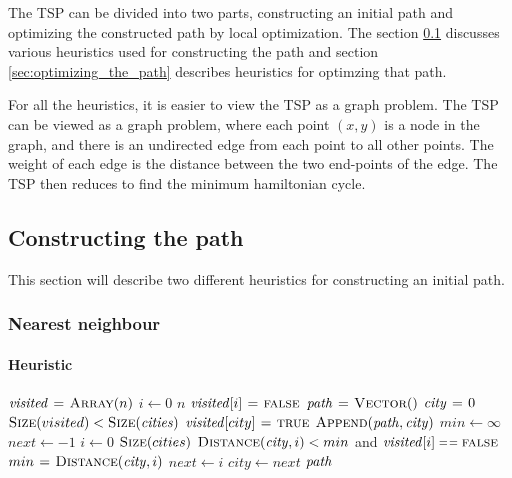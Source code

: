 The TSP can be divided into two parts, constructing an initial path and
optimizing the constructed path by local optimization.
The section \ref{sec:constructing_the_path}
discusses various heuristics used for constructing the path and section
\ref{sec:optimizing_the_path} describes heuristics for optimzing that path.  

For all the heuristics, it is easier to view the TSP as a graph problem.
The TSP can be viewed as a graph problem, where each point $(x, y)$ is a node in
the graph, and there is an undirected edge from each point to all other points. 
The weight of each edge is the distance between the two end-points of the edge.
The TSP then reduces to find the minimum hamiltonian cycle.

\subsection{Constructing the path}
\label{sec:constructing_the_path}
This section will describe two different heuristics for constructing an
initial path.

\subsubsection{Nearest neighbour}
\label{sec:nearest_neighbour}
\paragraph{Heuristic}
\begin{codebox}
\li $\id{visited} \gets \proc{Array}(n)$
\li \For $i \gets 0$ \To $n$
\li     \Do
            $\id{visited}[i] \gets \const{false}$
        \End
\li $\id{path} \gets \proc{Vector}()$
\li $\id{city} \gets 0$
\li \While $\proc{Size}(visited) < \proc{Size}(\id{cities})$
\label{li:nn:outer}
\li     \Do
            $\id{visited}[city] \gets \const{true}$
\li         $\proc{Append}(\id{path}, \id{city})$
\li         $min \gets \infty$
\li         $next \gets -1$
\li         \For $i \gets 0$ \To $\textnormal{\scshape Size}(cities)$ \label{li:nn:inner}
\li             \Do
                    \If $\proc{Distance}(\id{city}, i) < min$ and
                        $\id{visited}[i] \isequal \const{false}$
\li                     \Then
                            $min \gets \proc{Distance}(\id{city}, i)$
\li                         $next \gets i$
                        \End
                \End
\li         $city \gets next$
        \End
\li \Return $\id{path}$
\end{codebox}
